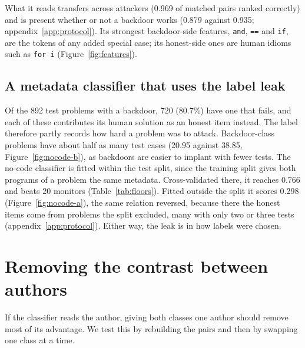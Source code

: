 \documentclass{article}
\newcommand{\nocodeCV}{0.766}
\newcommand{\nocodeCVCount}{20}
\newcommand{\nocodeOutside}{0.298}
\newcommand{\transfer}{0.969}
\newcommand{\pairWorking}{0.935}
\newcommand{\pairInert}{0.879}
\newcommand{\inertShare}{80.7\%}
\newcommand{\splitWithBackdoor}{892}\newcommand{\splitInert}{720}
\newcommand{\testCasesAttack}{20.95}
\newcommand{\testCasesHonest}{38.85}
\begin{document}
What it reads transfers across attackers (\transfer{} of matched pairs ranked correctly) and is
present whether or not a backdoor works (\pairInert{} against \pairWorking{};
appendix~\ref{app:protocol}). Its strongest backdoor-side features, \texttt{and}, \texttt{==} and
\texttt{if}, are the tokens of any added special case; its honest-side ones are human idioms such as
\texttt{for i} (Figure~\ref{fig:features}).

\subsection{A metadata classifier that uses the label leak}
\label{sec:label}

Of the \splitWithBackdoor{} test problems with a backdoor, \splitInert{} (\inertShare{}) have one that
fails, and each of these contributes its human solution as an honest item instead. The label
therefore partly records how hard a problem was to attack.
Backdoor-class problems have about half as many test cases (\testCasesAttack{} against
\testCasesHonest{}, Figure~\ref{fig:nocode-b}), as backdoors are easier to implant with fewer tests. 
The no-code classifier is fitted within the test split, since the
training split gives both programs of a problem the same metadata. Cross-validated there, it reaches
\nocodeCV{} and beats \nocodeCVCount{} monitors (Table~\ref{tab:floors}). Fitted outside the split it
scores \nocodeOutside{} (Figure~\ref{fig:nocode-a}), the same relation reversed,
because there the honest items come from problems the split excluded, many with only two or three
tests (appendix~\ref{app:protocol}). Either way, the leak is in how labels were chosen.

\section{Removing the contrast between authors}
\label{sec:samegen}

If the classifier reads the author, giving both classes one author should remove most of its
advantage. We test this by rebuilding the pairs and then by swapping one class at a time.
\end{document}
